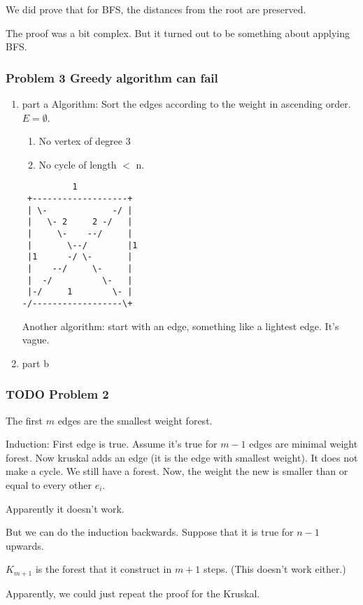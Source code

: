 \documentclass[11pt]{article}
\begin{document}
We did prove that for BFS, the distances from the root are preserved.

The proof was a bit complex. But it turned out to be something about
applying BFS.
\subsubsection{Problem 3 Greedy algorithm can fail}
\label{sec:orgc6883f8}
\begin{enumerate}
\item part a
\label{sec:orgb8fde84}
Algorithm: Sort the edges according to the weight in ascending order. \(E =
     \emptyset\). 
\begin{enumerate}
\item No vertex of degree \(3\)
\item No cycle of length \(<\) n.
\end{enumerate}

\begin{verbatim}
          1
 +-------------------+
 | \-             -/ |
 |   \- 2     2 -/   |
 |     \-    --/     |
 |       \--/        |1
 |1      -/ \-       |
 |    --/     \-     |
 |  -/          \-   |
 |-/     1        \- |
-/------------------\+
\end{verbatim}

Another algorithm: start with an edge, something like a lightest edge. It's
vague.


\item part b
\label{sec:org36b1066}
\end{enumerate}
\subsubsection{{\bfseries\sffamily TODO} Problem 2}
\label{sec:org6bb9262}
The first \(m\) edges are the smallest weight forest.

Induction: First edge is true. Assume it's true for \(m-1\) edges are minimal
weight forest. Now kruskal adds an edge (it is the edge with smallest
weight). It does not make a cycle. We still have a forest. Now, the weight
the new is smaller than or equal to every other \(e_i\). 

Apparently it doesn't work.

But we can do the induction backwards. Suppose that it is true for \(n-1\)
upwards.

\(K_{m+1}\) is the forest that it construct in \(m+1\) steps. (This doesn't work
either.)

Apparently, we could just repeat the proof for the Kruskal.
\end{document}
